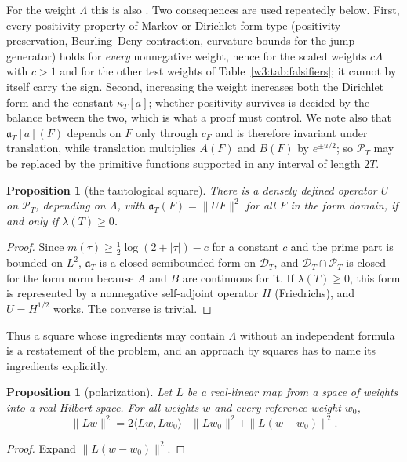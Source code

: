 \documentclass[11pt]{amsart}
\newtheorem{proposition}[theorem]{Proposition}
\theoremstyle{definition}
\theoremstyle{remark}
\numberwithin{equation}{section}
\newcommand{\cF}{c_F}                                  %
\newcommand{\PT}{\mathcal{P}_T}                        %
\newcommand{\DT}{\mathcal{D}_T}                        %
\newcommand{\aT}{\mathfrak{a}_T}                       %
\newcommand{\lam}{\lambda(T)}                          %
\begin{document}
For the weight $\Lambda$ this is also \cite[Theorem~3.3]{P46}. Two consequences are used repeatedly below. First, every
positivity property of Markov or Dirichlet-form type (positivity preservation, Beurling--Deny contraction, curvature
bounds for the jump generator) holds for \emph{every} nonnegative weight, hence for the scaled weights $c\Lambda$ with
$c>1$ and for the other test weights of Table~\ref{w3:tab:falsifiers}; it cannot by itself carry the sign. Second,
increasing the weight increases both the Dirichlet form and the constant $\kappa_T[a]$; whether positivity survives is
decided by the balance between the two, which is what a proof must control. We note also that $\aT[a](F)$ depends on $F$
only through $\cF$ and is therefore invariant under translation, while translation multiplies $A(F)$ and $B(F)$ by
$e^{\pm u/2}$; so $\PT$ may be replaced by the primitive functions supported in any interval of length $2T$.

\begin{proposition}[the tautological square]\label{w4:prop:taut}
There is a densely defined operator $U$ on $\PT$, depending on $\Lambda$, with $\aT(F)=\|UF\|^2$ for all $F$ in the form domain, if and only
if $\lam\ge0$.
\end{proposition}

\begin{proof}
Since $m(\tau)\ge\frac12\log(2+|\tau|)-c$ for a constant $c$ and the prime part is bounded on $L^2$, $\aT$ is a closed semibounded
form on $\DT$, and $\DT\cap\PT$ is closed for the form norm because $A$ and $B$ are continuous for it. If $\lam\ge0$, this form is represented by a nonnegative self-adjoint operator $H$ (Friedrichs), and
$U=H^{1/2}$ works. The converse is trivial.
\end{proof}

Thus a square whose ingredients may contain $\Lambda$ without an independent formula is a restatement of the problem, and
an approach by squares has to name its ingredients explicitly.

\begin{proposition}[polarization]\label{w4:prop:polar}
Let $L$ be a real-linear map from a space of weights into a real Hilbert space. For all weights $w$ and every reference weight $w_0$,
\[
\|Lw\|^2=2\langle Lw,Lw_0\rangle-\|Lw_0\|^2+\|L(w-w_0)\|^2 .
\]
\end{proposition}

\begin{proof}
Expand $\|L(w-w_0)\|^2$.
\end{proof}
\end{document}
